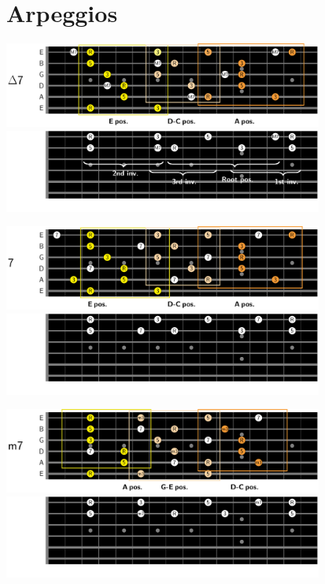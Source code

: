 \documentclass{article}
\begin{document}
\newpage
\section{Arpeggios}

\begin{table}[!h]
	\hspace*{-4cm}
	\includegraphics[width=10.5cm, trim= {0cm 0cm 0cm 0cm}, clip]{Arpeges/maj7_chords.pdf}
	\hspace*{-1cm}
	\includegraphics[width=10.5cm, trim= {0cm 0cm 0cm 0cm}, clip]{Arpeges/2notes_maj7_chords.pdf}
	
	\hspace*{-4cm}
	\includegraphics[width=10.5cm, trim= {0cm 0cm 0cm 0cm}, clip]{Arpeges/dom7_chords.pdf}
	\hspace*{-1cm}
	\includegraphics[width=10.5cm, trim= {0cm 0cm 0cm 0cm}, clip]{Arpeges/2notes_dom7_chords.pdf}
	
	\hspace*{-4cm}
	\includegraphics[width=10.5cm, trim= {0cm 0cm 0cm 0cm}, clip]{Arpeges/m7_chords.pdf}
	\hspace*{-1cm}
	\includegraphics[width=10.5cm, trim= {0cm 0cm 0cm 0cm}, clip]{Arpeges/2notes_m7_chords.pdf}
	

\end{table}
\end{document}

